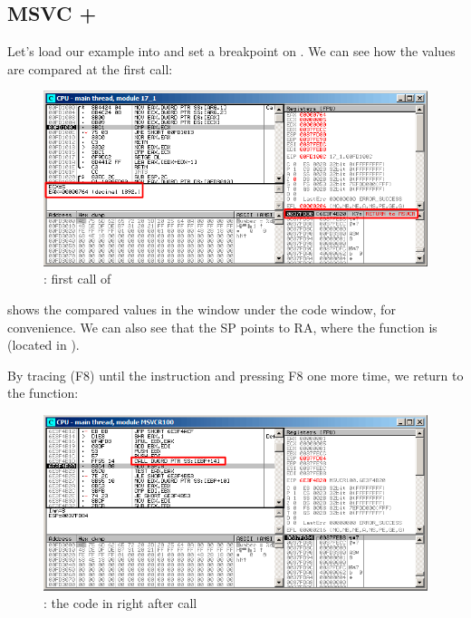 ﻿\clearpage
\subsection{MSVC + \olly}
\myindex{\olly}

Let's load our example into \olly and set a breakpoint on \comp.
We can see how the values are compared at the first \comp call:

\begin{figure}[H]
\centering
\includegraphics[scale=\FigScale]{patterns/18_pointers_to_functions/olly1.png}
\caption{\olly: first call of \comp}
\label{fig:qsort_olly1}
\end{figure}

\olly shows the compared values in the window under the code window, for convenience.
We can also see that the \ac{SP} points to \ac{RA}, where the \qsort function is (located in ).

\clearpage
By tracing (F8) until the  instruction and pressing F8 one more time, we return to the \qsort function:

\begin{figure}[H]
\centering
\includegraphics[scale=\FigScale]{patterns/18_pointers_to_functions/olly2.png}
\caption{\olly: the code in \qsort right after \comp call}
\label{fig:qsort_olly2}
\end{figure}

